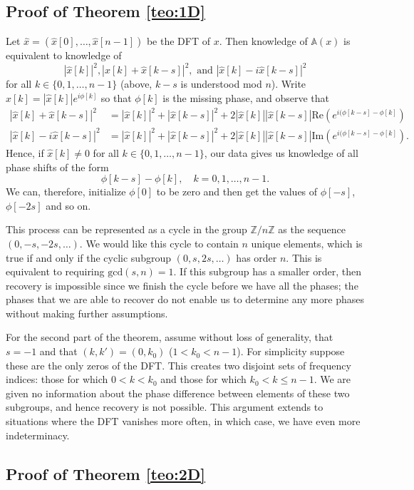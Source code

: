 \documentclass[11pt]{article}
\newcommand{\Z}{\mathbb{Z}}
\newcommand{\<}{\langle}
\renewcommand{\>}{\rangle}
\newcommand{\mapA}{\mathbb{A}}
\numberwithin{equation}{section}
\begin{document}
\subsection{Proof of Theorem \ref{teo:1D}}

Let $\hat{x} = (\hat x [0], \ldots, \hat x [n-1])$ be the DFT of $x$.
Then knowledge of $\mapA(x)$ is equivalent to knowledge of
\[
|\hat{x}[k]|^2, |\hat x[k] + \hat{x}[k-s]|^2, \text{ and } |\hat x[k]
-i \hat{x}[k-s]|^2
\]
for all $k \in \{0,1,\ldots, n-1\}$ (above, $k-s$ is understood mod
$n$). Write $\hat x[k] = |\hat x [k]| e^{i\phi[k]}$ so that $\phi[k]$
is the missing phase, and observe that
\begin{align*}
  |\hat x[k] + \hat{x}[k-s]|^2 & = |\hat x[k]|^2 + |\hat{x}[k-s]|^2 +
  2|\hat x[k]| |\hat x[k-s]| \text{Re}(e^{i(\phi[k-s] - \phi[k]})\\
  |\hat x[k] -i\hat{x}[k-s]|^2 & = |\hat x[k]|^2 + |\hat{x}[k-s]|^2 +
  2|\hat x[k]| |\hat x[k-s]| \text{Im}(e^{i(\phi[k-s] - \phi[k]}).
\end{align*}
Hence, if $\hat{x}[k] \neq 0$ for all $k \in \{0,1, \ldots, n-1\}$,
our data gives us knowledge of all phase shifts of the form
\[
\phi[k-s] - \phi[k], \quad k = 0,1, \ldots, n-1.
\]
We can, therefore, initialize $\phi[0]$ to be zero and then get the
values of $\phi[-s]$, $\phi[-2s]$ and so on.

This process can be represented as a cycle in the group $\Z/n\Z$ as
the sequence $(0,-s,-2s,\ldots)$. We would like this cycle to contain
$n$ unique elements, which is true if and only if the cyclic subgroup
$(0, s, 2s, \ldots )$ has order $n$. This is equivalent to requiring
$\text{gcd}(s,n) = 1$.  If this subgroup has a smaller order, then
recovery is impossible since we finish the cycle before we have all
the phases; the phases that we are able to recover do not enable us to
determine any more phases without making further assumptions.

For the second part of the theorem, assume without loss of generality,
that $s = -1$ and that $(k,k') = (0,k_0)$ ($1 < k_0 < n-1$). For
simplicity suppose these are the only zeros of the DFT. This creates
two disjoint sets of frequency indices: those for which $0 < k < k_0$
and those for which $k_0 < k \le n-1$. We are given no information
about the phase difference between elements of these two subgroups,
and hence recovery is not possible.  This argument extends to
situations where the DFT vanishes more often, in which case, we have
even more indeterminacy.

\subsection{Proof of Theorem \ref{teo:2D}}
\end{document}
